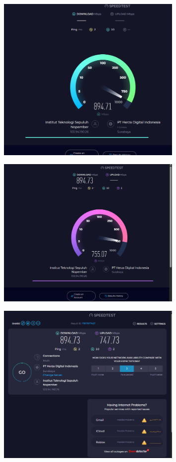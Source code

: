 \begin{figure}[H]

\centering
\includegraphics[width=0.8\textwidth]{P1/img/Screenshot 2025-06-05 191601.png}
\end{figure}
\begin{figure}[H]

\centering
\includegraphics[width=0.8\textwidth]{P1/img/Screenshot 2025-06-05 191620.png}
\end{figure}
\begin{figure}[H]

\centering
\includegraphics[width=0.8\textwidth]{P1/img/Screenshot 2025-06-05 191624.png}
\end{figure}
